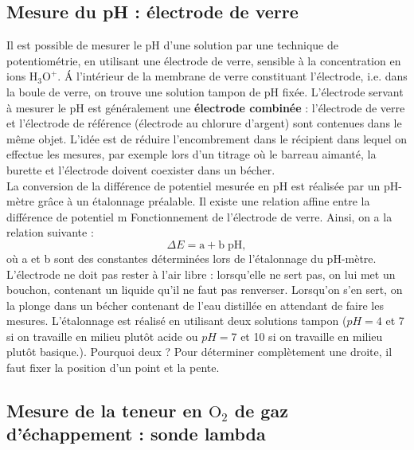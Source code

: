 \documentclass[11pt,a4paper]{report}
\begin{document}
\subsection{Mesure du pH : électrode de verre}

Il est possible de mesurer le pH d'une solution par une technique de potentiométrie, en utilisant une électrode de verre, sensible à la concentration en ions $\text{H}_3\text{O}^+$. \'A l'intérieur de la membrane de verre constituant l'électrode, i.e. dans la boule de verre, on trouve une solution tampon de pH fixée. L'électrode servant à mesurer le pH est généralement une \textbf{électrode combinée} : l'électrode de verre et l'électrode de référence (électrode au chlorure d'argent) sont contenues dans le même objet. L'idée est de réduire l'encombrement dans le récipient dans lequel on effectue les mesures, par exemple lors d'un titrage où le barreau aimanté, la burette et l'électrode doivent coexister dans un bécher.\\

La conversion de la différence de potentiel mesurée en pH est réalisée par un pH-mètre grâce à un étalonnage préalable. Il existe une relation affine entre la différence de potentiel m
Fonctionnement de l'électrode de verre. Ainsi, on a la relation suivante :
\begin{equation}
	\Delta E = \text{a} + \text{b}\;\text{pH},
\end{equation}
où a et b sont des constantes déterminées lors de l'étalonnage du pH-mètre.\\

L'électrode ne doit pas rester à l'air libre : lorsqu'elle ne sert pas, on lui met un bouchon, contenant un liquide qu'il ne faut pas renverser. Lorsqu'on s'en sert, on la plonge dans un bécher contenant de l'eau distillée en attendant de faire les mesures. L'étalonnage est réalisé en utilisant deux solutions tampon ($pH = 4$ et 7 si on travaille en milieu plutôt acide ou $pH = 7$ et 10 si on travaille en milieu plutôt basique.). Pourquoi deux ? Pour déterminer complètement une droite, il faut fixer la position d'un point et la pente.

\subsection{Mesure de la teneur en $\text{O}_2$ de gaz d'échappement : sonde lambda}
\end{document}
